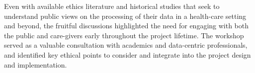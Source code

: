 \documentclass{article}
\begin{document}
Even with available ethics literature and historical studies that seek
to understand public views on the processing of their data in a
health-care setting and beyond, the fruitful discussions highlighted
the need for engaging with both the public and care-givers early
throughout the project lifetime. The workshop served as a valuable
consultation with academics and data-centric professionals, and
identified key ethical points to consider and integrate into the
project design and implementation. 


\printbibliography
\end{document}
